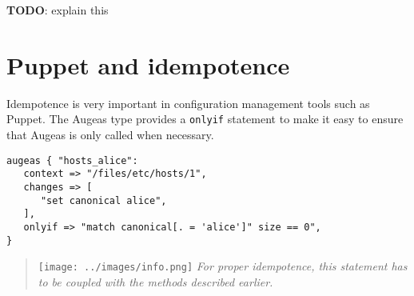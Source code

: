 \textbf{TODO}: explain this

\section{Puppet and idempotence}

Idempotence is very important in configuration management tools such as Puppet. The Augeas type provides a \verb!onlyif! statement to make it easy to ensure that Augeas is only called when necessary.

\begin{verbatim}
augeas { "hosts_alice":
   context => "/files/etc/hosts/1",
   changes => [
      "set canonical alice",
   ],
   onlyif => "match canonical[. = 'alice']" size == 0",
}
\end{verbatim}

\begin{quote}
\texttt{[image: ../images/info.png]} \emph{For proper idempotence, this statement has to be coupled with the methods described earlier.}
\end{quote}

